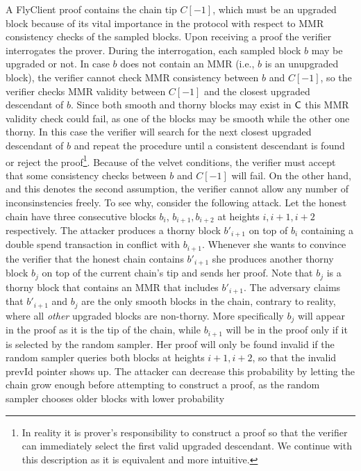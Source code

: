 	A FlyClient proof contains the chain tip $C[-1]$, which must be an upgraded block because of its vital importance in the protocol with respect to MMR consistency checks of the sampled blocks. 
	Upon receiving a proof the verifier interrogates the prover. During the interrogation, each sampled block $b$ may
	be upgraded or not. In case $b$ does not contain an MMR (i.e., $b$ is an unupgraded block), the verifier cannot check MMR consistency
	between $b$ and $C[-1]$, so the verifier checks MMR validity between $C[-1]$ and the closest upgraded descendant of $b$.
	Since both smooth and thorny blocks may exist in $\mathsf{C}$ this MMR validity check could fail, as one of the blocks may be smooth while the other one thorny.
	In this case the verifier will search for the next closest upgraded descendant of $b$ and repeat the procedure until a consistent descendant is found or reject 
	the proof\footnote{
	In reality it is prover's responsibility to construct a proof so that the verifier can immediately select the first valid upgraded descendant. We continue 
	with this description as it is equivalent and more intuitive.
	}.
	Because of the velvet conditions, the verifier must accept that some consistency checks between $b$ and $C[-1]$ will fail.
	On the other hand, and this denotes the second assumption, the verifier cannot allow any number of inconsinstencies freely. To see why,
	consider the following attack. Let the honest chain have three consecutive blocks $b_i$, $b_{i+1}, b_{i+2}$ at heights $i, i+1, i+2$ respectively. The attacker 
	produces a thorny block $b'_{i+1}$ on top of $b_i$ containing a double spend transaction in conflict with $b_{i+1}$.
	Whenever she wants to convince the verifier that the honest chain contains $b'_{i+1}$ she produces another thorny block $b_j$ on top of the current chain's tip 
	and sends her proof. Note that $b_j$ is a thorny block that contains an MMR that includes
	$b'_{i+1}$. The adversary claims that $b'_{i+1}$ and $b_j$ are the only smooth blocks in the chain, contrary to reality, where all \emph{other} upgraded blocks 
	are non-thorny.
	More specifically $b_j$ will appear in the proof as it is the tip of the chain, while $b_{i+1}$ will be in the proof
	only if it is selected by the random sampler. Her proof will only be found invalid if the random sampler queries both blocks at heights $i+1, i+2$, so that 
	the invalid prevId pointer shows up. The attacker can decrease this probability
	by letting the chain grow enough before attempting to construct a proof, as the random sampler chooses older blocks with lower probability 
